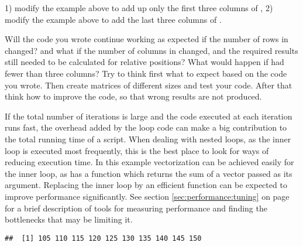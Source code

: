 \documentclass[krantz2]{krantz}\usepackage{knitr}%
\begin{document}
\begin{playground}
1) modify the example above to add up only the first three columns of , 2) modify the example above to add the last three columns of .

Will the code you wrote continue working as expected if the number of rows in  changed? and what if the number of columns in  changed, and the required results still needed to be calculated for relative positions? What would happen if  had fewer than three columns? Try to think first what to expect based on the code you wrote. Then create matrices of different sizes and test your code. After that think how to improve the code, so that wrong results are not produced.
\end{playground}

\begin{explainbox}
If the total number of iterations is large and the code executed at each iteration runs fast, the overhead added by the loop code can make a big contribution to the total running time of a script.
When dealing with nested loops, as the inner loop is executed most frequently, this is the best place to look for ways of reducing execution time. In this example vectorization can be achieved easily for the inner loop, as \Rlang has a function  which returns the sum of a vector passed as its argument. Replacing the inner loop by an efficient function can be expected to improve performance significantly. See section \ref{sec:performance:tuning} on page \pageref{sec:performance:tuning} for a brief description of tools for measuring performance and finding the bottlenecks that may be limiting it.

\begin{knitrout}\footnotesize
{}\color{fgcolor}\begin{kframe}
\begin{alltt}
 \hlkwb{<-} \hlstd{(} 
   \hlopt{:}
   \hlkwb{<-} 
\hlstd{\}}
\end{alltt}
\begin{verbatim}
##  [1] 105 110 115 120 125 130 135 140 145 150
\end{verbatim}
\end{kframe}
\end{knitrout}


\end{explainbox}
\end{document}
